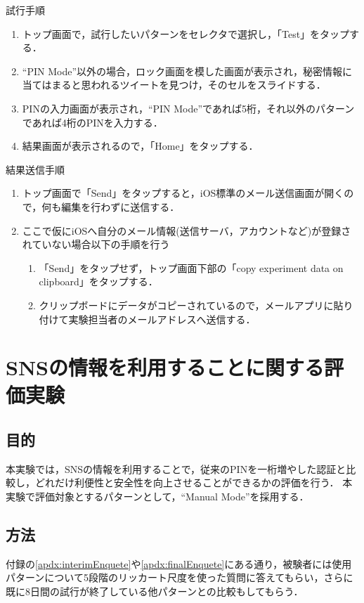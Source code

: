 試行手順
\begin{enumerate}
  \item トップ画面で，試行したいパターンをセレクタで選択し，「Test」をタップする．
  \item ``PIN Mode''以外の場合，ロック画面を模した画面が表示され，秘密情報に当てはまると思われるツイートを見つけ，そのセルをスライドする．
  \item PINの入力画面が表示され，``PIN Mode''であれば5桁，それ以外のパターンであれば4桁のPINを入力する．
  \item 結果画面が表示されるので，「Home」をタップする．
\end{enumerate}

結果送信手順
\begin{enumerate}
  \item トップ画面で「Send」をタップすると，iOS標準のメール送信画面が開くので，何も編集を行わずに送信する．
  \item ここで仮にiOSへ自分のメール情報(送信サーバ，アカウントなど)が登録されていない場合以下の手順を行う
  \begin{enumerate}
    \item 「Send」をタップせず，トップ画面下部の「copy experiment data on clipboard」をタップする．
    \item クリップボードにデータがコピーされているので，メールアプリに貼り付けて実験担当者のメールアドレスへ送信する．
  \end{enumerate}
\end{enumerate}

\section{SNSの情報を利用することに関する評価実験}\label{sec:vsTweet}
\subsection{目的}
本実験では，SNSの情報を利用することで，従来のPINを一桁増やした認証と比較し，どれだけ利便性と安全性を向上させることができるかの評価を行う．
本実験で評価対象とするパターンとして，``Manual Mode''を採用する．

\subsection{方法}
付録の\ref{apdx:interimEnquete}や\ref{apdx:finalEnquete}にある通り，被験者には使用パターンについて5段階のリッカート尺度を使った質問に答えてもらい，さらに既に8日間の試行が終了している他パターンとの比較もしてもらう．

